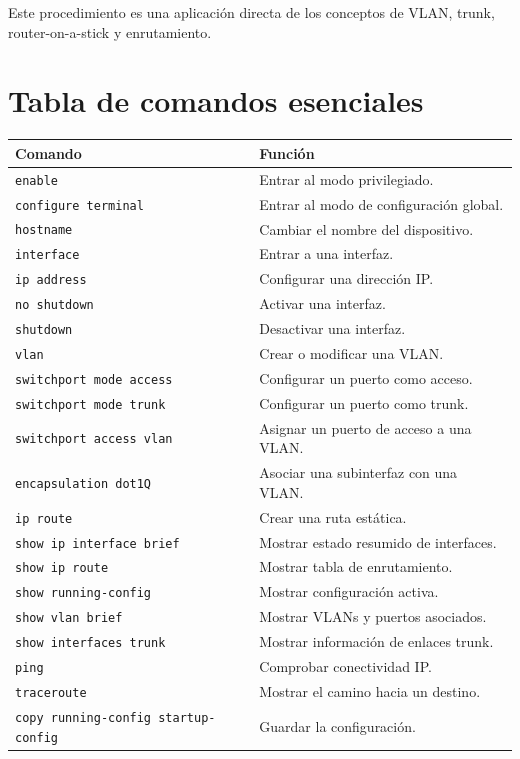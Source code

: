 \documentclass[12pt]{article}
\begin{document}
Este procedimiento es una aplicación directa de los conceptos de VLAN,
trunk, router-on-a-stick y enrutamiento.


\section{Tabla de comandos esenciales}

\begin{center}
\renewcommand{\arraystretch}{1.3}
\begin{tabular}{|l|p{8cm}|}
\hline
\textbf{Comando} & \textbf{Función} \\
\hline
\texttt{enable} & Entrar al modo privilegiado. \\
\hline
\texttt{configure terminal} & Entrar al modo de configuración global. \\
\hline
\texttt{hostname} & Cambiar el nombre del dispositivo. \\
\hline
\texttt{interface} & Entrar a una interfaz. \\
\hline
\texttt{ip address} & Configurar una dirección IP. \\
\hline
\texttt{no shutdown} & Activar una interfaz. \\
\hline
\texttt{shutdown} & Desactivar una interfaz. \\
\hline
\texttt{vlan} & Crear o modificar una VLAN. \\
\hline
\texttt{switchport mode access} & Configurar un puerto como acceso. \\
\hline
\texttt{switchport mode trunk} & Configurar un puerto como trunk. \\
\hline
\texttt{switchport access vlan} & Asignar un puerto de acceso a una VLAN. \\
\hline
\texttt{encapsulation dot1Q} & Asociar una subinterfaz con una VLAN. \\
\hline
\texttt{ip route} & Crear una ruta estática. \\
\hline
\texttt{show ip interface brief} & Mostrar estado resumido de interfaces. \\
\hline
\texttt{show ip route} & Mostrar tabla de enrutamiento. \\
\hline
\texttt{show running-config} & Mostrar configuración activa. \\
\hline
\texttt{show vlan brief} & Mostrar VLANs y puertos asociados. \\
\hline
\texttt{show interfaces trunk} & Mostrar información de enlaces trunk. \\
\hline
\texttt{ping} & Comprobar conectividad IP. \\
\hline
\texttt{traceroute} & Mostrar el camino hacia un destino. \\
\hline
\texttt{copy running-config startup-config} & Guardar la configuración. \\
\hline
\end{tabular}
\end{center}
\end{document}
